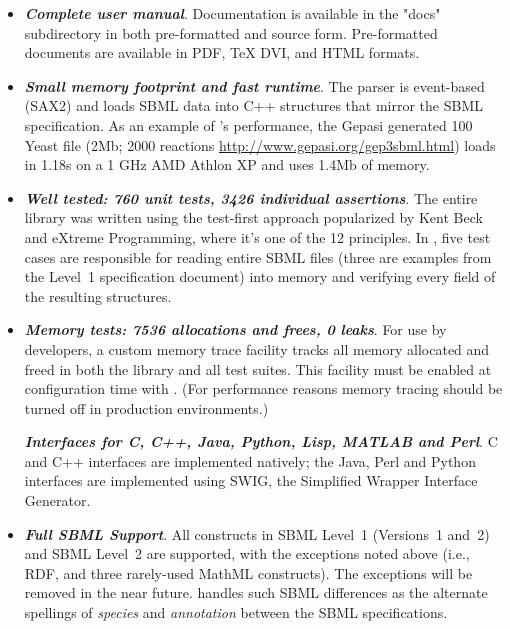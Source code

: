 \documentclass{sbmlmanual}
\begin{document}
\begin{itemize}
  
\item \textbf{\textsl{Complete user manual}}. Documentation is available in
  the "docs" subdirectory in both pre-formatted and source form.
  Pre-formatted documents are available in PDF, TeX DVI, and HTML formats.
  
\item \textbf{\textsl{Small memory footprint and fast runtime}}. The parser
  is event-based (SAX2) and loads SBML data into C++ structures that mirror
  the SBML specification.  As an example of \libsbml{}'s performance, the
  Gepasi generated 100 Yeast file (2Mb; 2000 reactions
  \url{http://www.gepasi.org/gep3sbml.html}) loads in 1.18s on a 1 GHz AMD
  Athlon XP and uses 1.4Mb of memory.
      
\item \textbf{\textsl{Well tested: 760 unit tests, 3426 individual
      assertions}}.  The entire library was written using the test-first
  approach popularized by Kent Beck and eXtreme Programming, where it's one
  of the 12 principles.  In \libsbml{}, five test cases are responsible for
  reading entire SBML files (three are examples from the Level~1
  specification document) into memory and verifying every field of the
  resulting structures.
      
\item \textbf{\textsl{Memory tests: 7536 allocations and frees, 0 leaks}}.
  For use by developers, a custom memory trace facility tracks all memory
  allocated and freed in both the library and all test suites.  This
  facility must be enabled at \libsbml{} configuration time with
  .  (For performance reasons
  memory tracing should be turned off in production environments.)
  
  \textbf{\textsl{Interfaces for C, C++, Java, Python, Lisp, MATLAB and
      Perl}}.  C and C++ interfaces are implemented natively; the Java,
  Perl and Python interfaces are implemented using SWIG, the Simplified
  Wrapper Interface Generator.

\item \textbf{\textsl{Full SBML Support}}.  All constructs in SBML Level~1
  (Versions~1 and~2) and SBML Level~2 are supported, with the exceptions
  noted above (i.e., RDF, and three rarely-used MathML constructs).  The
  exceptions will be removed in the near future.  \libsbml{} handles such
  SBML differences as the alternate spellings of \emph{species} and
  \emph{annotation} between the SBML specifications.
  

\end{itemize}
\end{document}

